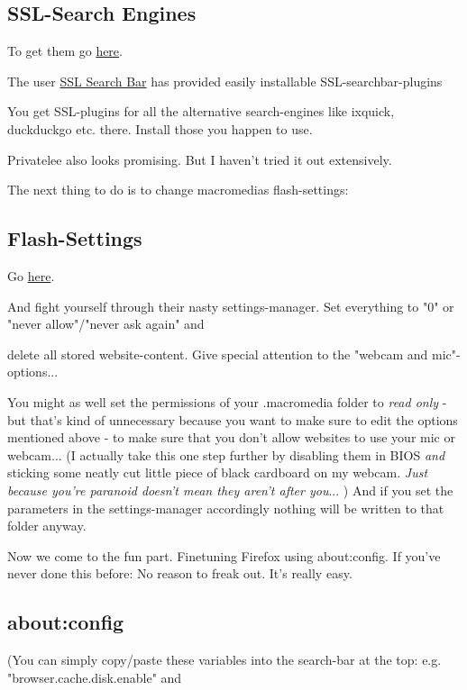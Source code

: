 \documentclass{article}
\begin{document}
\subsection{SSL-Search Engines}


 To get them go \href{https://addons.mozilla.org/en-US/firefox/user/5514668/}{here}.


 The user \href{https://addons.mozilla.org/en-US/firefox/user/5514668/}{SSL Search Bar} has provided easily installable SSL-searchbar-plugins


 You get SSL-plugins for all the alternative search-engines like ixquick, duckduckgo etc. there. Install those you happen to use. 


 Privatelee also looks promising. But I haven't tried it out extensively. 


 The next thing to do is to change macromedias flash-settings: 
\subsection{Flash-Settings}


 Go \href{https://www.macromedia.com/support/documentation/en/flashplayer/help/settings_manager03.html}{here}.


 And fight yourself through their nasty settings-manager. Set everything to "0" or "never allow"/"never ask again" and

delete all stored website-content. Give special attention to the "webcam and mic"-options... 


 You might as well set the permissions of your .macromedia folder to \emph{read only} - but that's kind of unnecessary because you want to make sure to edit the options mentioned above - to make sure that you don't allow websites to use your mic or webcam... (I actually take this one step further by disabling them in BIOS \emph{and} sticking some neatly cut little piece of black cardboard on my webcam. \emph{Just because you're paranoid doesn't mean they aren't after you}... ) And if you set the parameters in the settings-manager accordingly nothing will be written to that folder anyway. 


 Now we come to the fun part. Finetuning Firefox using about:config. If you've never done this before: No reason to freak out. It's really easy.
\subsection{about:config}


 (You can simply copy/paste these variables into the search-bar at the top: e.g. "browser.cache.disk.enable" and 
\end{document}
